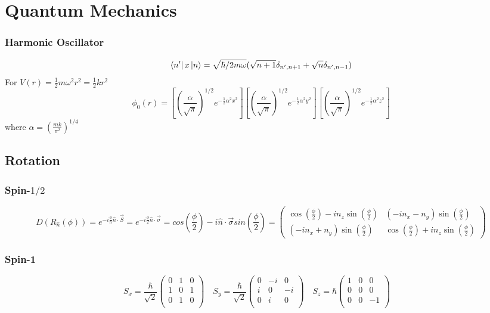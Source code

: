 \chapter{Quantum Mechanics}

\subsection{Harmonic Oscillator}
\[
    \bra{n'}x\ket{n}=\sqrt{\hbar/2m\omega}(\sqrt{n+1}\delta_{n',n+1}+\sqrt{n}\delta_{n',n-1})
    \]
For $V(r)=\frac{1}{2}m\omega^2r^2=\frac{1}{2}kr^2$
\[
    \phi_0(r)=[(\frac{\alpha}{\sqrt{\pi}})^{1/2}e^{-\frac{1}{2}\alpha^2x^2}]
    [(\frac{\alpha}{\sqrt{\pi}})^{1/2}e^{-\frac{1}{2}\alpha^2y^2}]
    [(\frac{\alpha}{\sqrt{\pi}})^{1/2}e^{-\frac{1}{2}\alpha^2z^2}]
    \]
where $\alpha=(\frac{mk}{\pi^2})^{1/4}$
\section{Rotation}

\subsection{Spin-$1/2$} 
\[ 
D(R_{\hat{n}}(\phi)) = e^{-i\frac{\phi}{\hbar}\hat{n}\cdot\vec{S}} = e^{-i\frac{\phi}{2}\hat{n}\cdot\vec{\sigma}} = 
cos(\frac{\phi}{2}) - i \hat{n} \cdot \vec{\sigma} sin(\frac{\phi}{2}) = 
\begin{pmatrix}
    \cos(\frac{\phi}{2}) - in_{z}\sin(\frac{\phi}{2}) & (-i n_{x} - n_{y})\sin(\frac{\phi}{2}) \\ 
    (-i n_{x} + n_{y})\sin(\frac{\phi}{2}) &  \cos(\frac{\phi}{2}) + in_{z}\sin(\frac{\phi}{2})  
\end{pmatrix}
\]

\subsection{Spin-1}
\begin{equation}
    S_x=\frac{\hbar}{\sqrt{2}}
    \begin{pmatrix}
	0   & 1	& 0 \\
	1   & 0	& 1 \\
	0   & 1	& 0 \\
    \end{pmatrix}\quad
    S_y=\frac{\hbar}{\sqrt{2}}
    \begin{pmatrix}
	0   & -i    & 0 \\
	i   & 0	& -i \\
	0   & i	& 0 \\
    \end{pmatrix}\quad
    S_z=\hbar
    \begin{pmatrix}
	1   & 0	& 0 \\
	0   & 0	& 0 \\
	0   & 0	& -1 \\
    \end{pmatrix}\quad
\end{equation}

